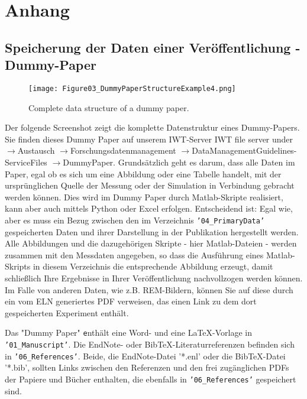 \pagebreak
\section{Anhang}
\subsection{Speicherung der Daten einer Veröffentlichung -
            \glqq Dummy-Paper\grqq{}}\label{app:dummy-paper}
\begin{wrapfigure}{r}{0.5\linewidth}
  \vspace{-1em}
  \texttt{[image: Figure03\_DummyPaperStructureExample4.png]}
  \caption{Complete data structure of a dummy paper.}
  \label{fig:dummy-paper}
\end{wrapfigure}
Der folgende Screenshot zeigt die komplette Datenstruktur eines Dummy-Papers. Sie finden dieses Dummy Paper auf unserem IWT-Server  IWT file server under $\rightarrow$Austausch $\rightarrow$For\-schungsdatenmanagement $\rightarrow$DataMan\-agementGuidelines-ServiceFiles  $\rightarrow$Dummy\-Paper. Grundsätzlich geht es darum, dass alle Daten im Paper, egal ob es sich um eine Abbildung oder eine Tabelle handelt, mit der ursprünglichen Quelle der Messung oder der Simulation in Verbindung gebracht werden können. Dies wird im Dummy Paper durch Matlab-Skripte realisiert, kann aber auch mittels Python oder Excel erfolgen. Entscheidend ist: Egal wie, aber
es muss ein Bezug zwischen den im Verzeichnis \texttt{'04\_PrimaryData'} gespeicherten Daten und ihrer Darstellung in der Publikation hergestellt werden. Alle Abbildungen und die dazugehörigen Skripte - hier Matlab-Dateien - werden zusammen mit den Messdaten angegeben, so dass die Ausführung eines Matlab-Skripts in diesem Verzeichnis die entsprechende Abbildung erzeugt, damit schließlich Ihre Ergebnisse in Ihrer Veröffentlichung nachvollzogen werden
können. Im Falle von anderen Daten, wie z.B. REM-Bildern, können Sie auf diese durch ein vom ELN generiertes PDF verweisen, das einen Link zu dem dort gespeicherten Experiment enthält.

Das "Dummy Paper" \verb+e+nthält eine Word- und eine LaTeX-Vorlage in
\texttt{'01\_Manuscript'}. Die EndNote- oder BibTeX-Literaturreferenzen
befinden sich in \texttt{'06\_References'}. Beide, die EndNote-Datei '*.enl'
oder die BibTeX-Datei '*.bib', sollten Links zwischen den Referenzen und den
frei zugänglichen PDFs der Papiere und Bücher enthalten, die ebenfalls in
\texttt{'06\_References'} gespeichert sind.

